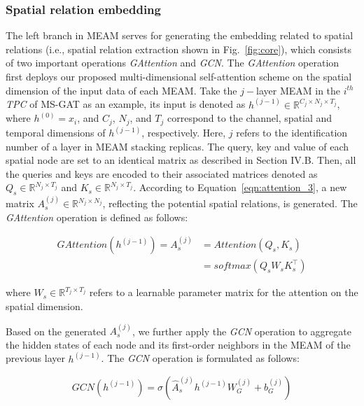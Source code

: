 \subsubsection{Spatial relation embedding}
The left branch in MEAM serves for generating the embedding related to spatial relations (i.e., spatial relation extraction shown in Fig.~\ref{fig:core}), which consists of two important operations \textit{GAttention} and \textit{GCN}. The \textit{GAttention} operation first deploys our proposed multi-dimensional self-attention scheme on the spatial dimension of the input data of each MEAM. Take the $j-$layer MEAM in the $i^{th}$ \textit{TPC} of MS-GAT as an example, its input is denoted as $h^{(j-1)} \in \mathbb{R}^{C_j \times N_j \times T_j}$, where $h^{(0)} = x_i$, and $C_j$, $N_j$, and $T_j$ correspond to the channel, spatial and temporal dimensions of $h^{(j-1)}$, respectively. Here, $j$ refers to the identification number of a layer in MEAM stacking replicas. The query, key and value of each spatial node are set to an identical matrix as described in Section IV.B. Then, all the queries and keys are encoded to their associated matrices denoted as $Q_s \in \mathbb{R}^{N_j \times T_j}$ and $K_s \in \mathbb{R}^{N_j \times T_j}$. According to Equation~\ref{eqn:attention_3}, a new matrix $A_s^{(j)} \in \mathbb{R}^{N_j \times N_j}$, reflecting the potential spatial relations, is generated. The \textit{GAttention} operation is defined as follows:

\begin{equation}
    \label{eqn:graph_attention}
    \begin{aligned}
        GAttention(h^{(j-1)}) = A_s^{(j)} & = Attention(Q_s, K_s)      \\
                                          & = softmax(Q_s W_s K_s^\top)
    \end{aligned}
\end{equation}

where $W_s \in \mathbb{R}^{T_j \times T_j}$ refers to a learnable parameter matrix for the attention on the spatial dimension.

Based on the generated $A_s^{(j)}$, we further apply the \textit{GCN} operation to aggregate the hidden states of each node and its first-order neighbors in the MEAM of the previous layer $h^{(j-1)}$. The \textit{GCN} operation is formulated as follows:

\begin{equation}
    \label{eqn:graph_convolution}
    GCN(h^{(j-1)}) =\sigma(\hat{A}_s^{(j)} h^{(j-1)} W_G^{(j)} + b_G^{(j)})
\end{equation}

